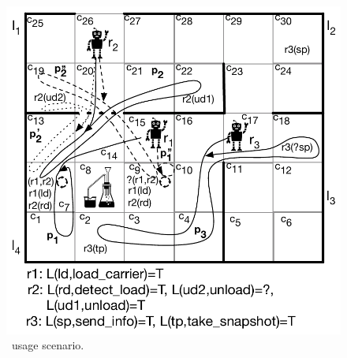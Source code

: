\begin{figure}[t]
\begin{center}
\includegraphics[width=1\linewidth]{Figures/motivatingExample.pdf}
\caption{\toolName\ usage scenario.}
\label{fig:outputexample}
\end{center}
\end{figure}






